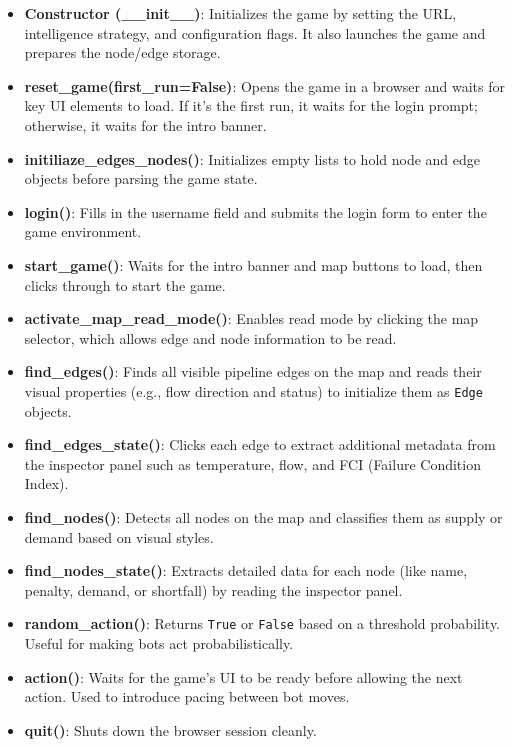 \documentclass[12pt,a4paper]{article}
\begin{document}
    \begin{itemize}
        \item \textbf{Constructor (\_\_init\_\_)}: Initializes the game by setting the URL, intelligence strategy, and configuration flags. It also launches the game and prepares the node/edge storage.
        
        \item \textbf{reset\_game(first\_run=False)}: Opens the game in a browser and waits for key UI elements to load. If it's the first run, it waits for the login prompt; otherwise, it waits for the intro banner.

        \item \textbf{initiliaze\_edges\_nodes()}: Initializes empty lists to hold node and edge objects before parsing the game state.

        \item \textbf{login()}: Fills in the username field and submits the login form to enter the game environment.

        \item \textbf{start\_game()}: Waits for the intro banner and map buttons to load, then clicks through to start the game.

        \item \textbf{activate\_map\_read\_mode()}: Enables read mode by clicking the map selector, which allows edge and node information to be read.

        \item \textbf{find\_edges()}: Finds all visible pipeline edges on the map and reads their visual properties (e.g., flow direction and status) to initialize them as \texttt{Edge} objects.

        \item \textbf{find\_edges\_state()}: Clicks each edge to extract additional metadata from the inspector panel such as temperature, flow, and FCI (Failure Condition Index).

        \item \textbf{find\_nodes()}: Detects all nodes on the map and classifies them as supply or demand based on visual styles.

        \item \textbf{find\_nodes\_state()}: Extracts detailed data for each node (like name, penalty, demand, or shortfall) by reading the inspector panel.

        \item \textbf{random\_action()}: Returns \texttt{True} or \texttt{False} based on a threshold probability. Useful for making bots act probabilistically.

        \item \textbf{action()}: Waits for the game’s UI to be ready before allowing the next action. Used to introduce pacing between bot moves.

        \item \textbf{quit()}: Shuts down the browser session cleanly.
    \end{itemize}
\end{document}

